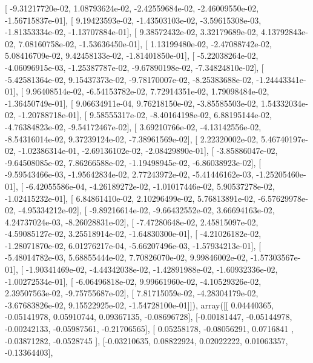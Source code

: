 \documentclass{article}
\begin{document}
       [ -9.31217720e-02,   1.08793624e-02,  -2.42559684e-02,
         -2.46009550e-02,  -1.56715837e-01],
       [  9.19423593e-02,  -1.43503103e-02,  -3.59615308e-03,
         -1.81353334e-02,  -1.13707884e-01],
       [  9.38572432e-02,   3.32179689e-02,   4.13792843e-02,
          7.08160758e-02,  -1.53636450e-01],
       [  1.13199480e-02,  -2.47088742e-02,   5.08416709e-02,
          9.42458133e-02,  -1.81401850e-01],
       [ -5.22038264e-02,  -4.06096915e-03,  -1.25387787e-02,
         -9.67890198e-02,  -7.34824810e-02],
       [ -5.42581364e-02,   9.15437373e-02,  -9.78170007e-02,
         -8.25383688e-02,  -1.24443341e-01],
       [  9.96408514e-02,  -6.54153782e-02,   7.72914351e-02,
          1.79098484e-02,  -1.36450749e-01],
       [  9.06634911e-04,   9.76218150e-02,  -3.85585503e-02,
          1.54332034e-02,  -1.20788718e-01],
       [  9.58555317e-02,  -8.40164198e-02,   6.88195144e-02,
         -4.76384823e-02,  -9.54172467e-02],
       [  3.69210766e-02,  -4.13142556e-02,  -8.54316014e-02,
          9.37239124e-02,  -7.38961569e-02],
       [  2.22320002e-02,   5.46740197e-02,  -1.02386314e-01,
         -2.69136102e-02,  -2.08429890e-01],
       [ -3.85886047e-02,  -9.64508085e-02,   7.86266588e-02,
         -1.19498945e-02,  -6.86038923e-02],
       [ -9.59543466e-03,  -1.95642834e-02,   2.77243972e-02,
         -5.41446162e-03,  -1.25205460e-01],
       [ -6.42055586e-04,  -4.26189272e-02,  -1.01017446e-02,
          5.90537278e-02,  -1.02415232e-01],
       [  6.84861410e-02,   2.10296499e-02,   5.76813891e-02,
         -6.57629978e-02,  -4.95334212e-02],
       [ -9.89216614e-02,  -9.66432552e-02,   3.66694163e-02,
          4.24737024e-03,  -8.26028831e-02],
       [ -7.47280648e-02,   2.45815097e-02,  -4.59085127e-02,
          3.25518914e-02,  -1.64830300e-01],
       [ -4.21026182e-02,  -1.28071870e-02,   6.01276217e-04,
         -5.66207496e-03,  -1.57934213e-01],
       [ -5.48014782e-03,   5.68855444e-02,   7.70826070e-02,
          9.99846002e-02,  -1.57303567e-01],
       [ -1.90341469e-02,  -4.44342038e-02,  -1.42891988e-02,
         -1.60932336e-02,  -1.00272534e-01],
       [ -6.06496818e-02,   9.99661960e-02,  -4.10529326e-02,
          2.39507563e-02,  -9.75755687e-02],
       [  7.81715059e-02,  -4.28304179e-02,  -3.67683826e-02,
          9.15522925e-02,  -1.54728100e-01]]), array([[ 0.04440365, -0.05141978,  0.05910744,  0.09367135, -0.08696728],
       [-0.00181447, -0.05144978, -0.00242133, -0.05987561, -0.21706565],
       [ 0.05258178, -0.08056291,  0.0716841 , -0.03871282, -0.0528745 ],
       [-0.03210635,  0.08822924,  0.02022222,  0.01063357, -0.13364403],
\end{document}
